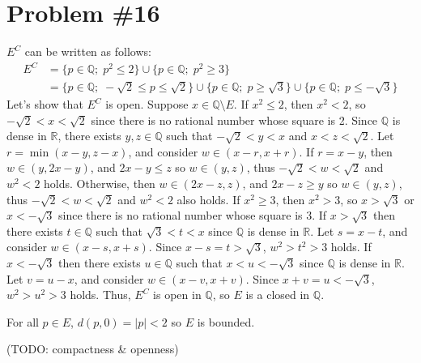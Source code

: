 \documentclass{scrartcl}
\begin{document}
\section{Problem \#16}
\(E^C\) can be written as follows:
\begin{align*}
  E^C &= \{p \in \mathbb{Q};\; p^2 \leq 2\} \cup \{p \in \mathbb{Q};\; p^2 \geq 3\} \\
      &= \{p \in \mathbb{Q};\; -\sqrt{2} \leq p \leq \sqrt{2}\} \cup \{p \in \mathbb{Q};\; p \geq \sqrt{3}\} \cup \{p \in \mathbb{Q};\; p \leq -\sqrt{3}\}
\end{align*}
Let's show that \(E^C\) is open.
Suppose \(x \in \mathbb{Q} \setminus E\).
If \(x^2 \leq 2\), then \(x^2 < 2\), so \(-\sqrt{2} < x < \sqrt{2}\) since there is no rational number whose square is 2.
Since \(\mathbb{Q}\) is dense in \(\mathbb{R}\), there exists \(y, z \in \mathbb{Q}\) such that \(-\sqrt{2} < y < x\) and \(x < z < \sqrt{2}\).
Let \(r = \min(x - y, z - x)\), and consider \(w \in (x - r, x + r)\).
If \(r = x - y\), then \(w \in (y, 2x - y)\), and \(2x - y \leq z\) so \(w \in (y, z)\), thus \(-\sqrt{2} < w < \sqrt{2}\) and \(w^2 < 2\) holds.
Otherwise, then \(w \in (2x - z, z)\), and \(2x - z \geq y\) so \(w \in (y, z)\), thus \(-\sqrt{2} < w < \sqrt{2}\) and \(w^2 < 2\) also holds.
If \(x^2 \geq 3\), then \(x^2 > 3\), so \(x > \sqrt{3}\) or \(x < -\sqrt{3}\) since there is no rational number whose square is 3.
If \(x > \sqrt{3}\) then there exists \(t \in \mathbb{Q}\) such that \(\sqrt{3} < t < x\) since \(\mathbb{Q}\) is dense in \(\mathbb{R}\).
Let \(s = x - t\), and consider \(w \in (x - s, x + s)\).
Since \(x - s = t > \sqrt{3}\), \(w^2 > t^2 > 3\) holds.
If \(x < -\sqrt{3}\) then there exists \(u \in \mathbb{Q}\) such that \(x < u < -\sqrt{3}\) since \(\mathbb{Q}\) is dense in \(\mathbb{R}\).
Let \(v = u - x\), and consider \(w \in (x - v, x + v)\).
Since \(x + v = u < -\sqrt{3}\), \(w^2 > u^2 > 3\) holds.
Thus, \(E^C\) is open in \(\mathbb{Q}\), so \(E\) is a closed in \(\mathbb{Q}\).

For all \(p \in E\), \(d(p, 0) = |p| < 2\) so \(E\) is bounded.

(TODO: compactness \& openness)
\end{document}
